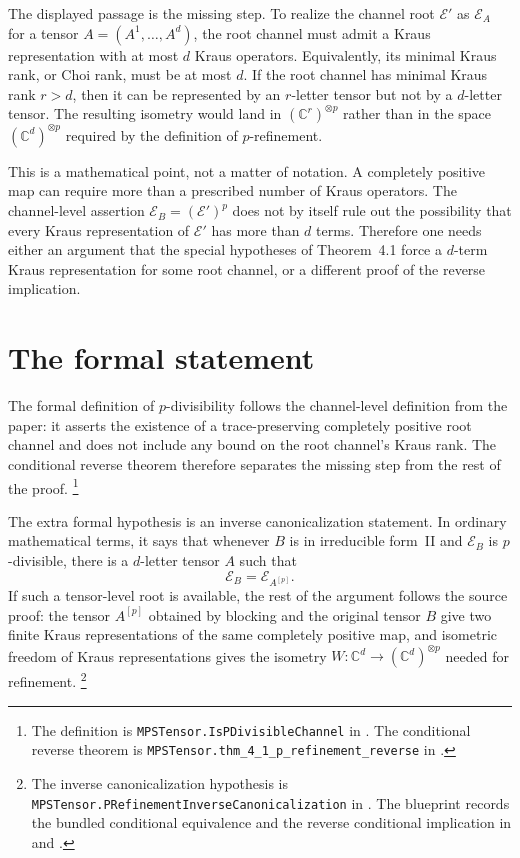 \documentclass{article}
\begin{document}
The displayed passage is the missing step. To realize the channel root
$\mathcal E'$ as $\mathcal E_A$ for a tensor
$A=(A^1,\ldots,A^d)$, the root channel must admit a Kraus representation with at
most $d$ Kraus operators. Equivalently, its minimal Kraus rank, or Choi rank,
must be at most $d$. If the root channel has minimal Kraus rank $r>d$, then it
can be represented by an $r$-letter tensor but not by a $d$-letter tensor. The
resulting isometry would land in $(\mathbb C^r)^{\otimes p}$ rather than in the
space $(\mathbb C^d)^{\otimes p}$ required by the definition of $p$-refinement.

This is a mathematical point, not a matter of notation. A completely positive map
can require more than a prescribed number of Kraus operators. The channel-level
assertion $\mathcal E_B=(\mathcal E')^p$ does not by itself rule out the possibility that
every Kraus representation of $\mathcal E'$ has more than $d$ terms. Therefore
one needs either an argument that the special hypotheses of Theorem~4.1 force a
$d$-term Kraus representation for some root channel, or a different proof of the
reverse implication.

\section{The formal statement}

The formal definition of $p$-divisibility follows the channel-level definition
from the paper: it asserts the existence of a trace-preserving completely
positive root channel and does not include any bound on the root channel's Kraus
rank. The conditional reverse theorem therefore separates the missing step from
the rest of the proof.
\footnote{The definition is
\texttt{MPSTensor.IsPDivisibleChannel} in
. The conditional
reverse theorem is \texttt{MPSTensor.thm\_4\_1\_p\_refinement\_reverse} in
.}

The extra formal hypothesis is an inverse canonicalization statement. In
ordinary mathematical terms, it says that whenever $B$ is in irreducible form~II
and $\mathcal E_B$ is $p$-divisible, there is a $d$-letter tensor $A$ such that
\[
  \mathcal E_B=\mathcal E_{A^{[p]}}.
\]
If such a tensor-level root is available, the rest of the argument follows
the source proof: the tensor $A^{[p]}$ obtained by blocking and the original
tensor $B$ give two finite Kraus representations of the same completely positive map, and
isometric freedom of Kraus representations gives the isometry
$W:\mathbb C^d\to(\mathbb C^d)^{\otimes p}$ needed for refinement.
\footnote{The inverse canonicalization hypothesis is
\texttt{MPSTensor.PRefinementInverseCanonicalization} in
. The blueprint
records the bundled conditional equivalence and the reverse conditional
implication in
 and
.}
\end{document}
